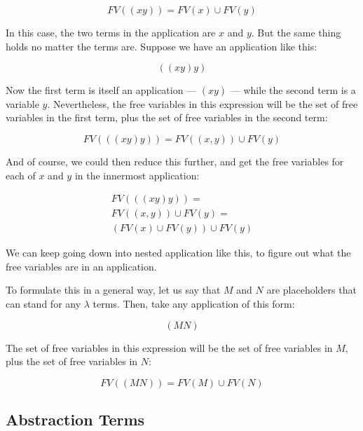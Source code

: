 \documentclass{book}
\numberwithin{equation}{chapter}
\begin{document}
\begin{equation}
FV((x y)) = FV(x) \cup FV(y)
\end{equation}

\noindent
In this case, the two terms in the application are $x$ and $y$. But the same thing holds no matter the terms are. Suppose we have an application like this:

\begin{equation}
((x y) y)
\end{equation}

\noindent
Now the first term is itself an application --- $(x y)$ --- while the second term is a variable $y$. Nevertheless, the free variables in this expression will be the set of free variables in the first term, plus the set of free variables in the second term:

\begin{equation}
FV(((x y) y)) = FV((x, y)) \cup FV(y)
\end{equation}

\noindent
And of course, we could then reduce this further, and get the free variables for each of $x$ and $y$ in the innermost application:

\begin{align}
FV(((x y) y)) = \\ FV((x, y)) \cup FV(y) = \\ (FV(x) \cup FV(y)) \cup FV(y)
\end{align}

\noindent
We can keep going down into nested application like this, to figure out what the free variables are in an application.

To formulate this in a general way, let us say that $M$ and $N$ are placeholders that can stand for any $\lambda$ terms. Then, take any application of this form:

\begin{equation}
(M N)
\end{equation}

\noindent
The set of free variables in this expression will be the set of free variables in $M$, plus the set of free variables in $N$:

\begin{equation}
FV((M N)) = FV(M) \cup FV(N)
\end{equation}


\subsection{Abstraction Terms}
\end{document}
